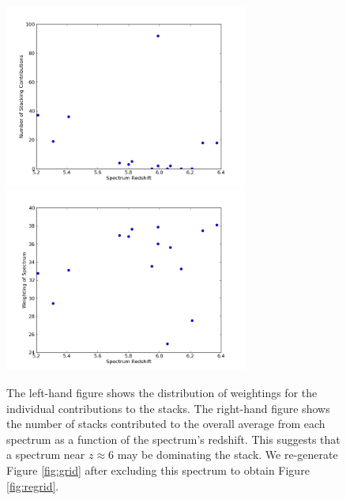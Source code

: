 \documentclass[11pt]{article}
\begin{document}
\begin{figure}[h]
  \centering
  \includegraphics[width=8cm]{CountsVsZ.png}
  \includegraphics[width=8cm]{WeightingVsZ.png}
  \caption{The left-hand figure shows the distribution of weightings for the individual contributions to the stacks. The right-hand figure shows the number of stacks contributed to the overall average from each spectrum as a function of the spectrum's redshift. This suggests that a spectrum near $z \approx 6$ may be dominating the stack. We re-generate Figure \ref{fig:grid} after excluding this spectrum to obtain Figure \ref{fig:regrid}.}
  \label{fig:todo}
\end{figure}
\end{document}
